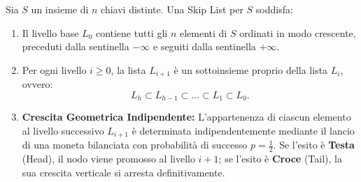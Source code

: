 \begin{definition}
Sia $S$ un insieme di $n$ chiavi distinte. Una Skip List per $S$ soddisfa:
\begin{enumerate}
  \item Il livello base $L_0$ contiene tutti gli $n$ elementi di $S$ ordinati in modo crescente, preceduti dalla sentinella $-\infty$ e seguiti dalla sentinella $+\infty$.
  \item Per ogni livello $i \ge 0$, la lista $L_{i+1}$ è un sottoinsieme proprio della lista $L_i$, ovvero:
  \begin{equation}
    L_h \subset L_{h-1} \subset \dots \subset L_1 \subset L_0.
  \end{equation}
  \item \textbf{Crescita Geometrica Indipendente:} L'appartenenza di ciascun elemento al livello successivo $L_{i+1}$ è determinata indipendentemente mediante il lancio di una moneta bilanciata con probabilità di successo $p = \frac{1}{2}$. Se l'esito è \textbf{Testa} (Head), il nodo viene promosso al livello $i+1$; se l'esito è \textbf{Croce} (Tail), la sua crescita verticale si arresta definitivamente.
\end{enumerate}
\end{definition}

